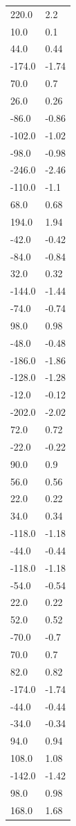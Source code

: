 \begin{longtable}{ll}
220.0 & 2.2 \\
10.0 & 0.1 \\
44.0 & 0.44 \\
-174.0 & -1.74 \\
70.0 & 0.7 \\
26.0 & 0.26 \\
-86.0 & -0.86 \\
-102.0 & -1.02 \\
-98.0 & -0.98 \\
-246.0 & -2.46 \\
-110.0 & -1.1 \\
68.0 & 0.68 \\
194.0 & 1.94 \\
-42.0 & -0.42 \\
-84.0 & -0.84 \\
32.0 & 0.32 \\
-144.0 & -1.44 \\
-74.0 & -0.74 \\
98.0 & 0.98 \\
-48.0 & -0.48 \\
-186.0 & -1.86 \\
-128.0 & -1.28 \\
-12.0 & -0.12 \\
-202.0 & -2.02 \\
72.0 & 0.72 \\
-22.0 & -0.22 \\
90.0 & 0.9 \\
56.0 & 0.56 \\
22.0 & 0.22 \\
34.0 & 0.34 \\
-118.0 & -1.18 \\
-44.0 & -0.44 \\
-118.0 & -1.18 \\
-54.0 & -0.54 \\
22.0 & 0.22 \\
52.0 & 0.52 \\
-70.0 & -0.7 \\
70.0 & 0.7 \\
82.0 & 0.82 \\
-174.0 & -1.74 \\
-44.0 & -0.44 \\
-34.0 & -0.34 \\
94.0 & 0.94 \\
108.0 & 1.08 \\
-142.0 & -1.42 \\
98.0 & 0.98 \\
168.0 & 1.68 \\

\end{longtable}
